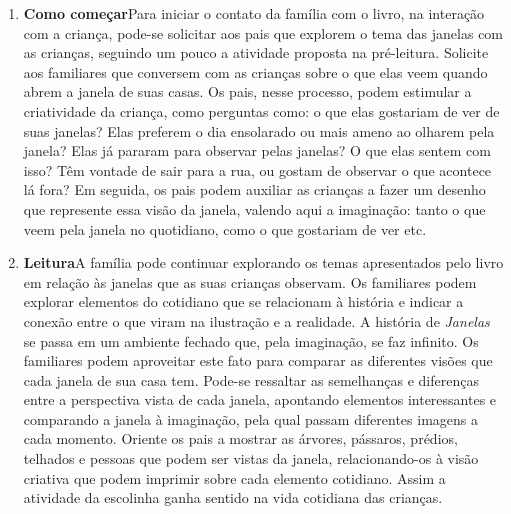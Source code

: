 \documentclass[11pt]{extarticle}
\begin{document}
\begin{enumerate}
\item \textbf{Como começar}\quad Para iniciar o contato da família com o livro, na interação com a criança, pode-se solicitar aos pais que explorem o tema das janelas com as crianças, seguindo um pouco a atividade proposta na pré-leitura.
Solicite aos familiares que conversem com as crianças sobre o que elas veem quando abrem a janela de suas casas. Os pais, nesse processo, podem estimular a criatividade da criança, como perguntas como: o que elas gostariam de ver de suas janelas? Elas preferem o dia ensolarado ou mais ameno ao olharem pela janela? Elas já pararam para observar pelas janelas? O que elas sentem com isso? Têm vontade de sair para a rua, ou gostam de observar o que acontece lá fora?
Em seguida, os pais podem auxiliar as crianças a fazer um desenho que represente essa visão da janela, valendo aqui a imaginação: tanto o que veem pela janela no quotidiano, como o que gostariam de ver etc.


\item \textbf{Leitura}\quad A família pode continuar explorando os temas apresentados pelo livro em relação às janelas que as suas crianças observam.
Os familiares podem explorar 
elementos do cotidiano que se relacionam à história e indicar a conexão 
entre o que viram na ilustração e a realidade. A história de \textit{Janelas}
se passa em um ambiente fechado que, pela imaginação, se faz infinito.
Os familiares podem aproveitar este fato 
para comparar as diferentes visões que cada janela de sua casa tem.
Pode-se ressaltar as semelhanças e diferenças entre a perspectiva vista de cada janela, apontando elementos interessantes e comparando a janela à imaginação, pela qual passam diferentes imagens a cada momento.
Oriente os pais a mostrar as 
árvores, pássaros, prédios, telhados e pessoas que podem ser vistas da janela, relacionando-os à visão criativa que podem imprimir sobre cada elemento cotidiano.
Assim a atividade da escolinha ganha sentido na vida cotidiana das crianças.



\end{enumerate}
\end{document}
